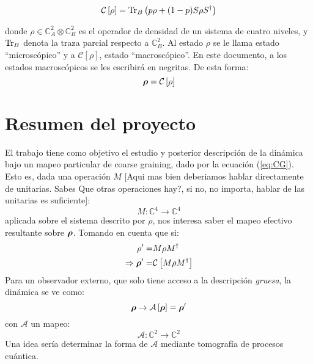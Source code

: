 \documentclass[onecolumn,11pt]{article}
\newcommand{\Cc}{\mathcal{C}} %
\newcommand{\Hh}{\mathbb{C}} %
\newcommand{\CG}[1]{\Cc\left[#1\right]}
\newcommand*{\B}[1]{\ifmmode\bm{#1}\else\textbf{#1}\fi}
\newcommand{\nota}[1]{{\color{red} [#1]}}
\begin{document}
\begin{equation}\label{eq:CG}
    \Cc\left[\rho\right]=\Tr_{B}\left(p\rho+(1-p)S\rho S^{\dag}\right)
\end{equation}

donde $\rho\in \Hh^{2}_{A}\otimes \Hh^{2}_{B}$ es el operador de densidad de un sistema de cuatro niveles, y $\Tr_{B}$ denota la traza parcial respecto a $\Hh^{2}_{B}$. Al estado $\rho$ se le llama estado ``microscópico'' y a $\CG{\rho}$, estado ``macroscópico''. En este documento, a los estados macroscópicos se les escribirá en negritas. De esta forma:
\begin{equation}
    \B{\rho}=\CG{\rho}
\end{equation}

\vspace{0.5cm}
\section{Resumen del proyecto}

El trabajo tiene como objetivo el estudio y posterior descripción de la dinámica bajo un mapeo particular de coarse graining, dado por la ecuación (\ref{eq:CG}). Esto es, dada una operación $M$ \nota{Aqui mas bien deberiamos hablar directamente de unitarias. Sabes Que otras operaciones hay?, si no, no importa, hablar de las unitarias es suficiente}:
\begin{equation}
    M:\Hh^{4}\rightarrow\Hh^{4}
\end{equation}
aplicada sobre el sistema descrito por $\rho$, nos interesa saber el mapeo efectivo resultante sobre $\B{\rho}$. Tomando en cuenta que si:
\begin{align}
    \rho'=&M\rho M^{\dag}\\
    \Rightarrow \B{\rho}'=&\CG{M\rho M^{\dag}}
\end{align}
Para un observador externo, que solo tiene acceso a la descripción \textit{gruesa}, la dinámica se ve como:
\begin{equation}\label{eq:obs}
    \B{\rho}\rightarrow\mathcal{A}\left[\B{\rho}\right]=\B{\rho}'
\end{equation}
con $\mathcal{A}$ un mapeo:
\begin{equation}
    \mathcal{A}:\Hh^{2}\rightarrow\Hh^{2}
\end{equation}
Una idea sería determinar la forma de $\mathcal{A}$ mediante tomografía de procesos cuántica. 
\end{document}
